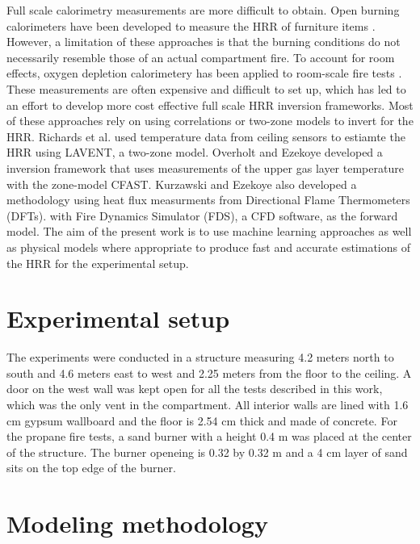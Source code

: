 \documentclass{article}
\begin{document}
Full scale calorimetry measurements are more difficult to obtain. Open burning calorimeters have been developed to measure the HRR of furniture items \cite{babrauskas1982upholstered}. However, a limitation of these approaches is that the burning conditions do not necessarily resemble those of an actual compartment fire. To account for room effects, oxygen depletion calorimetery has been applied to room-scale fire tests \cite{abecassis2008characterisation}. These measurements are often expensive and difficult to set up, which has led to an effort to develop more cost effective full scale HRR inversion frameworks. Most of these approaches rely on using correlations or two-zone models to invert for the HRR. Richards et al. \cite{richards1997fire} used temperature data from ceiling sensors to estiamte the HRR using LAVENT, a two-zone model. Overholt and Ezekoye \cite{overholt2012characterizing} developed a inversion framework that uses measurements of the upper gas layer temperature with the zone-model CFAST. Kurzawski and Ezekoye also developed a methodology using heat flux measurments from Directional Flame Thermometers (DFTs). with Fire Dynamics Simulator (FDS), a CFD software, as the forward model. The aim of the present work is to use machine learning approaches as well as physical models where appropriate to produce fast and accurate estimations of the HRR for the experimental setup. 




\section{Experimental setup}


The experiments were conducted in a structure measuring 4.2 meters north to south and 4.6 meters east to west and 2.25 meters from the floor to the ceiling. A door on the west wall was kept open for all the tests described in this work, which was the only vent in the compartment. All interior walls are lined with 1.6 cm gypsum wallboard and the floor is 2.54 cm thick and made of concrete. For the propane fire tests, a sand burner with a height 0.4 m was placed at the center of the structure. The burner openeing is 0.32 by 0.32 m and a 4 cm layer of sand sits on the top edge of the burner. 







\section{Modeling methodology}
\end{document}
